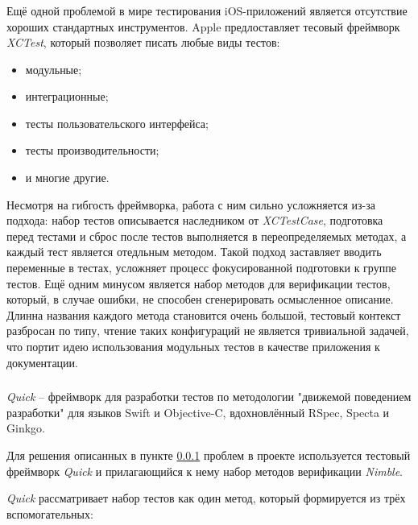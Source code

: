 \subsubsection{}
\label{sec:testing:tech:xctest}

Ещё одной проблемой в мире тестирования iOS-приложений является отсутствие хороших стандартных инструментов. Apple предлоставляет тесовый фреймворк \textit{XCTest}, который позволяет писать любые виды тестов:

\begin{itemize}
	\item модульные;
	\item интеграционные;
	\item тесты пользовательского интерфейса;
	\item тесты производительности;
	\item и многие другие.
\end{itemize}

Несмотря на гибгость фреймворка, работа с ним сильно усложняется из-за подхода: набор тестов описывается наследником от \textit{XCTestCase}, подготовка перед тестами и сброс после тестов выполняется в переопределяемых методах, а каждый тест является отедльным методом. Такой подход заставляет вводить переменные в тестах, усложняет процесс фокусированной подготовки к группе тестов. Ещё одним минусом является набор методов для верификации тестов, который, в случае ошибки, не способен сгенерировать осмысленное описание. Длинна названия каждого метода становится очень большой, тестовый контекст разбросан по типу, чтение таких конфигураций не является тривиальной задачей, что портит идею использования модульных тестов в качестве приложения к документации.

\subsubsection{}
\label{sec:testing:tech:quick}
\textit{Quick} -- фреймворк для разработки тестов по методологии "движемой поведением разработки" для языков Swift и Objective-C, вдохновлённый RSpec, Specta и Ginkgo\cite{github:quick}.

Для решения описанных в пункте \ref{sec:testing:tech:xctest} проблем в проекте используется тестовый фреймворк \textit{Quick} и прилагающийся к нему набор методов верификации \textit{Nimble}.

\textit{Quick} рассматривает набор тестов как один метод, который формируется из трёх вспомогательных:

